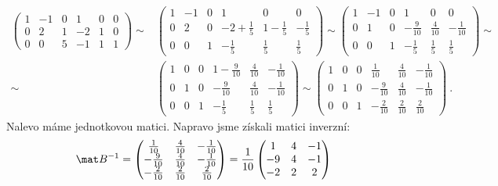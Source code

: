 \begin{example}
\begin{align}
        \left(\begin{array}{rrr|rrr}
            1 & -1 & 0 & 1 & 0 & 0\\
            0 & 2 & 1 & -2 & 1 & 0\\
            0 & 0 & 5 & -1 & 1 & 1
        \end{array}\right)
        \sim&
        \left(\begin{array}{rrr|rrr}
            1 & -1 & 0 & 1 & 0 & 0\\
            0 & 2 & 0 & -2+\frac{1}{5} & 1-\frac{1}{5} & -\frac{1}{5}\\
            0 & 0 & 1 & -\frac{1}{5} & \frac{1}{5} & \frac{1}{5}
        \end{array}\right)
        \sim
        \left(\begin{array}{rrr|rrr}
            1 & -1 & 0 & 1 & 0 & 0\\
            0 & 1 & 0 & -\frac{9}{10} & \frac{4}{10} & -\frac{1}{10}\\
            0 & 0 & 1 & -\frac{1}{5} & \frac{1}{5} & \frac{1}{5}
        \end{array}\right)
        \sim \\ \sim&
        \left(\begin{array}{rrr|rrr}
            1 & 0 & 0 & 1-\frac{9}{10} & \frac{4}{10} & -\frac{1}{10}\\
            0 & 1 & 0 & -\frac{9}{10} & \frac{4}{10} & -\frac{1}{10}\\
            0 & 0 & 1 & -\frac{1}{5} & \frac{1}{5} & \frac{1}{5}
        \end{array}\right)
        \sim
        \left(\begin{array}{rrr|rrr}
            1 & 0 & 0 & \frac{1}{10} & \frac{4}{10} & -\frac{1}{10}\\
            0 & 1 & 0 & -\frac{9}{10} & \frac{4}{10} & -\frac{1}{10}\\
            0 & 0 & 1 & -\frac{2}{10} & \frac{2}{10} & \frac{2}{10}
        \end{array}\right) \:.
    \end{align}
    Nalevo máme jednotkovou matici. Napravo jsme získali matici inverzní:
    \begin{align}
        \mat B^{-1} = \begin{pmatrix}
            \frac{1}{10} & \frac{4}{10} & -\frac{1}{10}\\
            -\frac{9}{10} & \frac{4}{10} & -\frac{1}{10}\\
            -\frac{2}{10} & \frac{2}{10} & \frac{2}{10}
        \end{pmatrix}
        = \frac{1}{10} \begin{pmatrix}
            1 & 4 & -1 \\
            -9 & 4 & -1 \\
            -2 & 2 & 2
        \end{pmatrix}
    \end{align}


\end{example}
